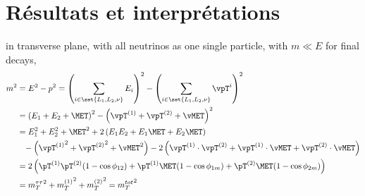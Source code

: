 \section{Résultats et interprétations}\label{chapter-HTT_analysis-section-results}


in transverse plane,
with all neutrinos as one single particle,
with $m\ll E$ for final decays,
\begin{align}
m^2 &= E^2 - p^2
= \left( \sum_{i \in \set{L_1,L_2,\nu}} E_i \right)^2 - \left( \sum_{i \in \set{L_1,L_2,\nu}} \vpT^i \right)^2\\
&= \left( E_1 + E_2 + \MET \right)^2 - \left( \vpT^{(1)} + \vpT^{(2)} + \vMET \right)^2\\
&= E_1^2 + E_2^2 + \MET^2 + 2 \left( E_1E_2 + E_1\MET + E_2\MET \right)\\
&\hphantom{=} - \left( {\vpT^{(1)}}^2 + {\vpT^{(2)}}^2 + {\vMET}^2 \right) - 2 \left( \vpT^{(1)}\cdot\vpT^{(2)} + \vpT^{(1)}\cdot\vMET + \vpT^{(2)}\cdot\vMET \right)\\
&= 2 \left( \pT^{(1)}\pT^{(2)}(1-\cos\phi_{12}) + \pT^{(1)}\MET(1-\cos\phi_{1m}) + \pT^{(2)}\MET(1-\cos\phi_{2m}) \right)\\
&= {m_T^{\tau\tau}}^2 + {m_T^{(1)}}^2 + {m_T^{(2)}}^{2} = {m_T^{tot}}^2
\end{align}


%
%
%
